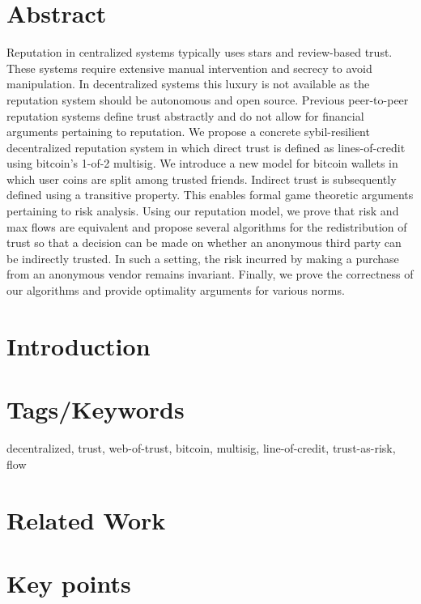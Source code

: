 \documentclass[11pt]{article}
\theoremstyle{definition}
\theoremstyle{corollary}
\begin{document}
  \section{Abstract}
  Reputation in centralized systems typically uses stars and review-based
  trust. These systems require extensive manual intervention and secrecy to
  avoid manipulation. In decentralized systems this luxury is not available
  as the reputation system should be autonomous and open source. Previous
  peer-to-peer reputation systems define trust abstractly and do not allow for
  financial arguments pertaining to reputation. We propose a concrete
  sybil-resilient decentralized reputation system in which direct trust is
  defined as lines-of-credit using bitcoin's 1-of-2 multisig. We introduce a new
  model for bitcoin wallets in which user coins are split among trusted friends.
  Indirect trust is subsequently defined using a transitive property. This
  enables formal game theoretic arguments pertaining to risk analysis. Using our
  reputation model, we prove that risk and max flows are equivalent and propose
  several algorithms for the redistribution of trust so that a decision can be
  made on whether an anonymous third party can be indirectly trusted. In such a
  setting, the risk incurred by making a purchase from an anonymous vendor
  remains invariant. Finally, we prove the correctness of our algorithms and
  provide optimality arguments for various norms.

  \section{Introduction}

  \section{Tags/Keywords}
      decentralized, trust, web-of-trust, bitcoin, multisig, line-of-credit, trust-as-risk, flow  

  \section{Related Work}

  \section{Key points}
\end{document}

